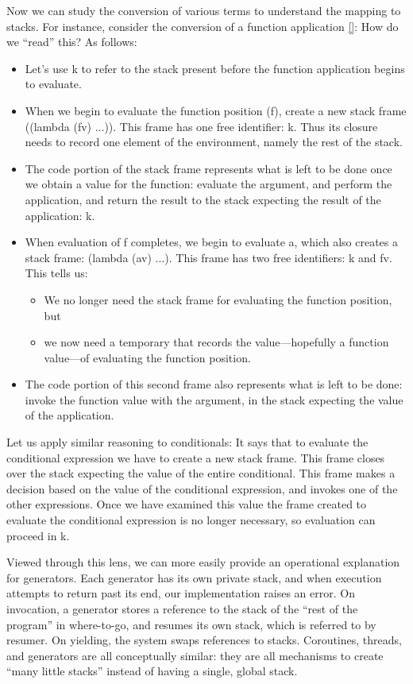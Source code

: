 Now we can study the conversion of various terms to understand the mapping to
stacks. For instance, consider the conversion of a function application \ref{}:
How do we ``read'' this? As follows:
\begin{itemize}
  \item 
Let’s use k to refer to the stack present before the function application begins
to evaluate.
  \item 
When we begin to evaluate the function position (f), create a new stack frame
((lambda (fv) ...)). This frame has one free identifier: k. Thus its closure
needs to record one element of the environment, namely the rest of the stack.
  \item 
The code portion of the stack frame represents what is left to be done once we
obtain a value for the function: evaluate the argument, and perform the
application, and return the result to the stack expecting the result of the
application: k.
  \item 
When evaluation of f completes, we begin to evaluate a, which also creates a
stack frame: (lambda (av) ...). This frame has two free identifiers: k and fv.
This tells us:
\begin{itemize}
  \item 
We no longer need the stack frame for evaluating the function position, but
  \item 
we now need a temporary that records the value—hopefully a function value—of
evaluating the function position.
\end{itemize}
  \item 
The code portion of this second frame also represents what is left to be done:
invoke the function value with the argument, in the stack expecting the value of
the application.
\end{itemize}
Let us apply similar reasoning to conditionals:
It says that to evaluate the conditional expression we have to create a new
stack frame. This frame closes over the stack expecting the value of the entire
conditional. This frame makes a decision based on the value of the conditional
expression, and invokes one of the other expressions. Once we have examined this
value the frame created to evaluate the conditional expression is no longer
necessary, so evaluation can proceed in k.

Viewed through this lens, we can more easily provide an operational explanation
for generators. Each generator has its own private stack, and when execution
attempts to return past its end, our implementation raises an error. On
invocation, a generator stores a reference to the stack of the “rest of the
program” in where-to-go, and resumes its own stack, which is referred to by
resumer. On yielding, the system swaps references to stacks. Coroutines,
threads, and generators are all conceptually similar: they are all mechanisms to
create “many little stacks” instead of having a single, global stack.
